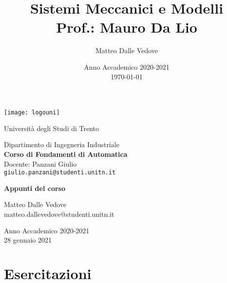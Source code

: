 \documentclass[10pt,a4paper,openright]{report}
\title{Sistemi Meccanici e Modelli \\ Prof.: Mauro Da Lio}
\author{Matteo Dalle Vedove}
\date{Anno Accademico 2020-2021 \\ \today}
\begin{document}
	
	\makeatletter
	\begin{center}
		\vspace{3cm}
		\thispagestyle{empty}
		\texttt{[image: logouni]}
		
		\vspace{2cm}
		
		{\Large Università degli Studi di Trento}
		
		\vspace{2cm}
		{\Large Dipartimento di Ingegneria Industriale} \\ \vspace{2mm}
		{\LARGE \textbf{Corso di Fondamenti di Automatica}} \\ \vspace{2mm}
		{\Large Docente: Panzani Giulio}\\
		\texttt{giulio.panzani@studenti.unitn.it}
		
		\vspace{2cm}
		{\LARGE \textbf{Appunti del corso}}
		
		\vspace{2cm}
		{\large 
			Matteo Dalle Vedove \\
			matteo.dallevedove@studenti.unitn.it
			
			\vspace{2cm}
			Anno Accademico 2020-2021 \\ 28 gennaio 2021}
	\end{center}
	
	\tableofcontents
	
	
	
	
	
	
	
	
	\chapter{Esercitazioni}
%	
	
\end{document}

